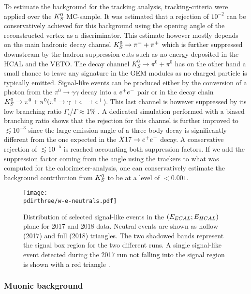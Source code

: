 To estimate the background for the tracking analysis, tracking-criteria were applied over the $K^0_S$ MC-sample. It was estimated that a rejection of $10^{-2}$ can be conservatively achieved for this background using the opening angle of the reconstructed vertex as a discriminator. This estimate however mostly depends on the main hadronic decay channel $K^0_S \rightarrow \pi^- + \pi^+$ which is further suppressed downstream by the hadron suppression cuts such as no energy deposited in the HCAL and the VETO. The decay channel $K^0_S \rightarrow \pi^0 + \pi^0$ has on the other hand a small chance to leave any signature in the GEM modules as no charged particle is typically emitted. Signal-like events can be produced either by the conversion of a photon from the $\pi^0 \rightarrow \gamma \gamma$ decay into a $e^+e^-$ pair or in the decay chain $K^0_S \rightarrow \pi^0 + \pi^0 (\pi^0 \rightarrow \gamma + e^- + e^+$). This last channel is however suppressed by its low branching ratio $\Gamma_i$/$\Gamma \approx $1\% \cite{review-particle-physics}. A dedicated simulation performed with a biased branching ratio shows that the rejection for this channel is further improved to $\lesssim 10^{-3}$ since the large emission angle of a three-body decay is significantly different from the one expected in the $X17 \rightarrow e^+ e^-$ decay. A conservative rejection of $\lesssim 10^{-5}$ is reached accounting both suppression factors. If we add the suppression factor coming from the angle using the trackers to what was computed for the calorimeter-analysis, one can conservatively estimate the background contribution from $K^0_S$ to be at a level of $<0.001$.


\begin{figure}[bth!]
  \centering
  \texttt{[image: \\pdirthree/w-e-neutrals.pdf]}
  \caption[neutral events in visible mode]{Distribution of selected signal-like events in the $(E_{ECAL};E_{HCAL})$ plane for 2017 and 2018 data. Neutral events are shown as hollow (2017) and full (2018) triangles. The two shadowed bands represent the signal box region for the two different runs. A single signal-like event detected during the 2017 run not falling into the signal region is shown with a red triangle \cite{Banerjee:2019hmi}.}
  \label{fig:w-e-vis}
\end{figure}

\subsubsection{Muonic background}
\label{ch3:sec:bkg:vis:muon}

